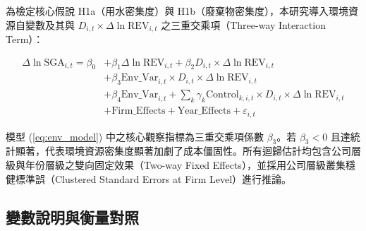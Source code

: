 \documentclass[12pt,a4paper]{article}
\begin{document}
為檢定核心假說 H1a（用水密集度）與 H1b（廢棄物密集度），本研究導入環境資源自變數及其與 $D_{i,t} \times \Delta\ln\text{REV}_{i,t}$ 之三重交乘項（Three-way Interaction Term）：

\begin{equation}
\label{eq:env_model}
\begin{aligned}
\Delta\ln\text{SGA}_{i,t} = \beta_0 &+ \beta_1 \Delta\ln\text{REV}_{i,t} + \beta_2 D_{i,t} \times \Delta\ln\text{REV}_{i,t} \\
&+ \beta_3 \text{Env\_Var}_{i,t} \times D_{i,t} \times \Delta\ln\text{REV}_{i,t} \\
&+ \beta_4 \text{Env\_Var}_{i,t} + \sum_k \gamma_k \text{Control}_{k,i,t} \times D_{i,t} \times \Delta\ln\text{REV}_{i,t} \\
&+ \text{Firm\_Effects} + \text{Year\_Effects} + \varepsilon_{i,t}
\end{aligned}
\end{equation}

模型 (\ref{eq:env_model}) 中之核心觀察指標為三重交乘項係數 $\beta_3$。若 $\beta_3 < 0$ 且達統計顯著，代表環境資源密集度顯著加劇了成本僵固性。所有迴歸估計均包含公司層級與年份層級之雙向固定效果（Two-way Fixed Effects），並採用公司層級叢集穩健標準誤（Clustered Standard Errors at Firm Level）進行推論。

\subsection{變數說明與衡量對照}
\end{document}
